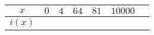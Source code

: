 {\begin{multicols}{2}
\begin{center}
\end{center}
	\begin{center}
\begin{tabular}{|c|c|c|c|c|c|c|}
	\hline
	\cellcolor{gray!40} $x$& $0$ & $4$ & $64$&$81$&$10000$\\
	\hline
	\cellcolor{gray!40} $i(x)$&\hspace{0.9cm}\phantom{t}&\hspace{0.9cm}\phantom{t}&\hspace{0.9cm}\phantom{t}&\hspace{0.9cm}\phantom{t} &\hspace{0.9cm}\phantom{t} \\
	\hline
\end{tabular}
\end{center}
\endgroup
    \end{multicols}

}
\correction{

}

